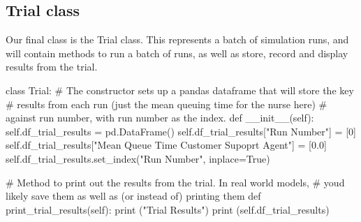 \documentclass[
  letterpaper,
  DIV=11,
  numbers=noendperiod]{scrreprt}
\newenvironment{Shaded}{\begin{snugshade}}{\end{snugshade}}
\newcommand{\BuiltInTok}[1]{\textcolor[rgb]{0.00,0.23,0.31}{#1}}
\newcommand{\CommentTok}[1]{\textcolor[rgb]{0.37,0.37,0.37}{#1}}
\newcommand{\DecValTok}[1]{\textcolor[rgb]{0.68,0.00,0.00}{#1}}
\newcommand{\FloatTok}[1]{\textcolor[rgb]{0.68,0.00,0.00}{#1}}
\newcommand{\FunctionTok}[1]{\textcolor[rgb]{0.28,0.35,0.67}{#1}}
\newcommand{\KeywordTok}[1]{\textcolor[rgb]{0.00,0.23,0.31}{#1}}
\newcommand{\NormalTok}[1]{\textcolor[rgb]{0.00,0.23,0.31}{#1}}
\newcommand{\OperatorTok}[1]{\textcolor[rgb]{0.37,0.37,0.37}{#1}}
\newcommand{\StringTok}[1]{\textcolor[rgb]{0.13,0.47,0.30}{#1}}
\newcommand{\VariableTok}[1]{\textcolor[rgb]{0.07,0.07,0.07}{#1}}
\begin{document}
\subsection{Trial class}\label{trial-class}

Our final class is the Trial class. This represents a batch of
simulation runs, and will contain methods to run a batch of runs, as
well as store, record and display results from the trial.

\begin{tcolorbox}[enhanced jigsaw, rightrule=.15mm, colback=white, colframe=quarto-callout-note-color-frame, colbacktitle=quarto-callout-note-color!10!white, toprule=.15mm, coltitle=black, opacityback=0, titlerule=0mm, bottomtitle=1mm, breakable, title=\textcolor{quarto-callout-note-color}{\faInfo}\hspace{0.5em}{Example trial class}, opacitybacktitle=0.6, toptitle=1mm, arc=.35mm, bottomrule=.15mm, leftrule=.75mm, left=2mm]

\begin{Shaded}
\begin{Highlighting}[]
\KeywordTok{class}\NormalTok{ Trial:}
    \CommentTok{\# The constructor sets up a pandas dataframe that will store the key}
    \CommentTok{\# results from each run (just the mean queuing time for the nurse here)}
    \CommentTok{\# against run number, with run number as the index.}
    \KeywordTok{def}  \FunctionTok{\_\_init\_\_}\NormalTok{(}\VariableTok{self}\NormalTok{):}
        \VariableTok{self}\NormalTok{.df\_trial\_results }\OperatorTok{=}\NormalTok{ pd.DataFrame()}
        \VariableTok{self}\NormalTok{.df\_trial\_results[}\StringTok{"Run Number"}\NormalTok{] }\OperatorTok{=}\NormalTok{ [}\DecValTok{0}\NormalTok{]}
        \VariableTok{self}\NormalTok{.df\_trial\_results[}\StringTok{"Mean Queue Time Customer Supoprt Agent"}\NormalTok{] }\OperatorTok{=}\NormalTok{ [}\FloatTok{0.0}\NormalTok{]}
        \VariableTok{self}\NormalTok{.df\_trial\_results.set\_index(}\StringTok{"Run Number"}\NormalTok{, inplace}\OperatorTok{=}\VariableTok{True}\NormalTok{)}

    \CommentTok{\# Method to print out the results from the trial.  In real world models,}
    \CommentTok{\# you\textquotesingle{}d likely save them as well as (or instead of) printing them}
    \KeywordTok{def}\NormalTok{ print\_trial\_results(}\VariableTok{self}\NormalTok{):}
        \BuiltInTok{print}\NormalTok{ (}\StringTok{"Trial Results"}\NormalTok{)}
        \BuiltInTok{print}\NormalTok{ (}\VariableTok{self}\NormalTok{.df\_trial\_results)}


\end{Highlighting}
\end{Shaded}
\end{tcolorbox}
\end{document}
